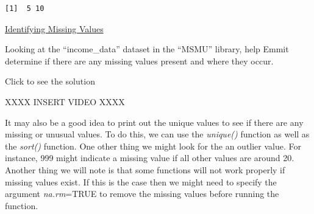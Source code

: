 \documentclass[
  letterpaper,
  DIV=11,
  numbers=noendperiod]{scrreprt}
\newenvironment{Shaded}{\begin{snugshade}}{\end{snugshade}}
\newcommand{\AttributeTok}[1]{\textcolor[rgb]{0.40,0.45,0.13}{#1}}
\newcommand{\ConstantTok}[1]{\textcolor[rgb]{0.56,0.35,0.01}{#1}}
\newcommand{\DecValTok}[1]{\textcolor[rgb]{0.68,0.00,0.00}{#1}}
\newcommand{\FunctionTok}[1]{\textcolor[rgb]{0.28,0.35,0.67}{#1}}
\newcommand{\NormalTok}[1]{\textcolor[rgb]{0.00,0.23,0.31}{#1}}
\newcommand{\SpecialCharTok}[1]{\textcolor[rgb]{0.37,0.37,0.37}{#1}}
\begin{document}
\begin{Shaded}
\end{Shaded}

\begin{verbatim}
[1]  5 10
\end{verbatim}

\begin{watch}{}{}
    \href{https://youtu.be/Gj_-ZS9wH6c}{Identifying Missing Values}
\end{watch}

\begin{tcolorbox}[enhanced jigsaw, colframe=quarto-callout-tip-color-frame, colback=white, breakable, rightrule=.15mm, title=\textcolor{quarto-callout-tip-color}{\faLightbulb}\hspace{0.5em}{Try it Out}, bottomtitle=1mm, toptitle=1mm, titlerule=0mm, left=2mm, coltitle=black, colbacktitle=quarto-callout-tip-color!10!white, leftrule=.75mm, opacitybacktitle=0.6, bottomrule=.15mm, opacityback=0, arc=.35mm, toprule=.15mm]

Looking at the ``income\_data'' dataset in the ``MSMU'' library, help
Emmit determine if there are any missing values present and where they
occur.

Click to see the solution

XXXX INSERT VIDEO XXXX

\end{tcolorbox}

It may also be a good idea to print out the unique values to see if
there are any missing or unusual values. To do this, we can use the
\emph{unique()} function as well as the \emph{sort()} function. One
other thing we might look for the an outlier value. For instance, 999
might indicate a missing value if all other values are around 20.
Another thing we will note is that some functions will not work properly
if missing values exist. If this is the case then we might need to
specify the argument \emph{na.rm}=TRUE to remove the missing values
before running the function.

\begin{Shaded}
\end{Shaded}
\end{document}
